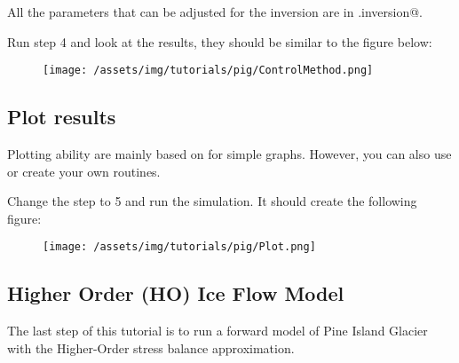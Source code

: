 All the parameters that can be adjusted for the inversion are in \verb@md.inversion@.

Run step 4 and look at the results, they should be similar to the figure below:
\begin{figure}[H]
	\begin{center}
		\texttt{[image: /assets/img/tutorials/pig/ControlMethod.png]}
	\end{center}
\end{figure}
\subsection{Plot results}%
Plotting ability are mainly based on \verb@plotmodel@ for simple graphs. However, you can also use or create your own routines.

Change the step to 5 and run the simulation. It should create the following figure:
\begin{figure}[H]
	\begin{center}
		\texttt{[image: /assets/img/tutorials/pig/Plot.png]}
	\end{center}
\end{figure}
\subsection{Higher Order (HO) Ice Flow Model}%
The last step of this tutorial is to run a forward model of Pine Island Glacier with the Higher-Order stress balance approximation.

